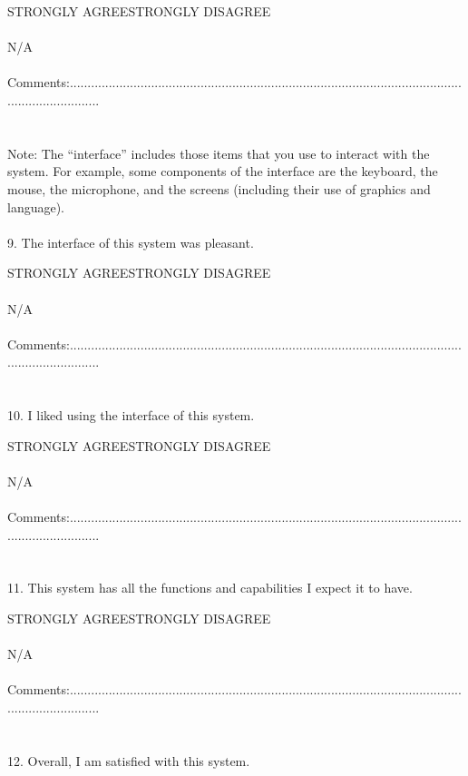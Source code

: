 \begin{appendix}
{STRONGLY AGREE\tab\tab\tab\tab\tab STRONGLY DISAGREE\\
\\
\tab\tab N/A\\
\\
Comments:.........................................................................................................................................\\
\\
\\
Note: The “interface” includes those items that you use to interact with the system. For example, some components of the interface are the keyboard, the mouse, the microphone, and the screens (including their use of graphics and language).\\
\\
9. The interface of this system was pleasant.

STRONGLY AGREE\tab\tab\tab\tab\tab STRONGLY DISAGREE\\
\\
\tab\tab N/A\\
\\
Comments:.........................................................................................................................................\\
\\
\\
10. I liked using the interface of this system.

STRONGLY AGREE\tab\tab\tab\tab\tab STRONGLY DISAGREE\\
\\
\tab\tab N/A\\
\\
Comments:.........................................................................................................................................\\
\\
\\
11. This system has all the functions and capabilities I expect it to have.

STRONGLY AGREE\tab\tab\tab\tab\tab STRONGLY DISAGREE\\
\\
\tab\tab N/A\\
\\
Comments:.........................................................................................................................................\\
\\
\\
12. Overall, I am satisfied with this system.

}
\end{appendix}
